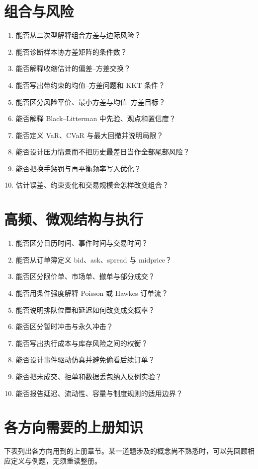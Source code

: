 \section{组合与风险}\label{route:portfolio-risk}

\begin{enumerate}
  \item 能否从二次型解释组合方差与边际风险？
  \item 能否诊断样本协方差矩阵的条件数？
  \item 能否解释收缩估计的偏差--方差交换？
  \item 能否写出带约束的均值--方差问题和 KKT 条件？
  \item 能否区分风险平价、最小方差与均值--方差目标？
  \item 能否解释 Black--Litterman 中先验、观点和置信度？
  \item 能否定义 VaR、CVaR 与最大回撤并说明局限？
  \item 能否设计压力情景而不把历史最差日当作全部尾部风险？
  \item 能否把换手惩罚与再平衡频率写入优化？
  \item 估计误差、约束变化和交易规模会怎样改变组合？
\end{enumerate}
\RouteScoreInterpretation

\section{高频、微观结构与执行}\label{route:microstructure}

\begin{enumerate}
  \item 能否区分日历时间、事件时间与交易时间？
  \item 能否从订单簿定义 bid、ask、spread 与 midprice？
  \item 能否区分限价单、市场单、撤单与部分成交？
  \item 能否用条件强度解释 Poisson 或 Hawkes 订单流？
  \item 能否说明排队位置和延迟如何改变成交概率？
  \item 能否区分暂时冲击与永久冲击？
  \item 能否写出执行成本与库存风险之间的权衡？
  \item 能否设计事件驱动仿真并避免偷看后续订单？
  \item 能否把未成交、拒单和数据丢包纳入反例实验？
  \item 能否报告延迟、流动性、容量与制度规则的适用边界？
\end{enumerate}
\RouteScoreInterpretation

\section{各方向需要的上册知识}

下表列出各方向用到的上册章节。某一道题涉及的概念尚不熟悉时，可以先回顾相应定义与例题，无须重读整册。


